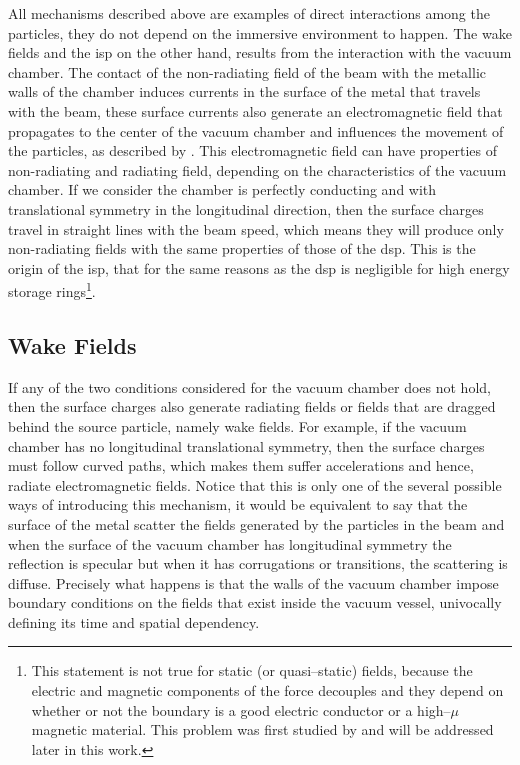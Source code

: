     All mechanisms described above are examples of direct interactions among the particles, they do not depend on the immersive environment to happen. The wake fields and the \gls{isp} on the other hand, results from the interaction with the vacuum chamber. The contact of the non-radiating field of the beam with the metallic walls of the chamber induces currents in the surface of the metal that travels with the beam, these surface currents also generate an electromagnetic field that propagates to the center of the vacuum chamber and influences the movement of the particles, as described by . This electromagnetic field can have properties of non-radiating and radiating field, depending on the characteristics of the vacuum chamber. If we consider the chamber is perfectly conducting and with translational symmetry in the longitudinal direction, then the surface charges travel in straight lines with the beam speed, which means they will produce only non-radiating fields with the same properties of those of the \gls{dsp}. This is the origin of the \gls{isp}, that for the same reasons as the \gls{dsp} is negligible for high energy storage rings\footnote{This statement is not true for static (or quasi--static) fields, because the electric and magnetic components of the force decouples and they depend on whether or not the boundary is a good electric conductor or a high--$\mu$ magnetic material. This problem was first studied by  and will be addressed later in this work.}.

\subsection{Wake Fields}\label{ssec:wake_fields}

    If any of the two conditions considered for the vacuum chamber does not hold, then the surface charges also generate radiating fields or fields that are dragged behind the source particle, namely wake fields. For example, if the vacuum chamber has no longitudinal translational symmetry, then the surface charges must follow curved paths, which makes them suffer accelerations and hence, radiate electromagnetic fields. Notice that this is only one of the several possible ways of introducing this mechanism, it would be equivalent to say that the surface of the metal scatter the fields generated by the particles in the beam and when the surface of the vacuum chamber has longitudinal symmetry the reflection is specular but when it has corrugations or transitions, the scattering is diffuse. Precisely what happens is that the walls of the vacuum chamber impose boundary conditions on the fields that exist inside the vacuum vessel, univocally defining its time and spatial dependency.

